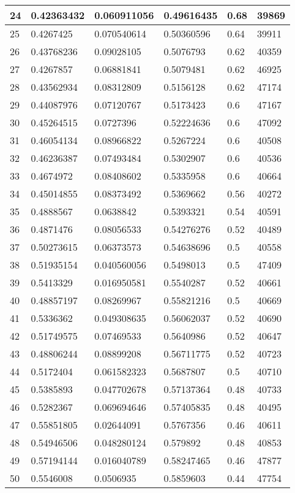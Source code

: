 \begin{longtable}{|l|l|l|l|l|l|}
24 & 0.42363432 & 0.060911056 & 0.49616435 & 0.68 & 39869 \\ \hline 
25 & 0.4267425 & 0.070540614 & 0.50360596 & 0.64 & 39911 \\ \hline 
26 & 0.43768236 & 0.09028105 & 0.5076793 & 0.62 & 40359 \\ \hline 
27 & 0.4267857 & 0.06881841 & 0.5079481 & 0.62 & 46925 \\ \hline 
28 & 0.43562934 & 0.08312809 & 0.5156128 & 0.62 & 47174 \\ \hline 
29 & 0.44087976 & 0.07120767 & 0.5173423 & 0.6 & 47167 \\ \hline 
30 & 0.45264515 & 0.0727396 & 0.52224636 & 0.6 & 47092 \\ \hline 
31 & 0.46054134 & 0.08966822 & 0.5267224 & 0.6 & 40508 \\ \hline 
32 & 0.46236387 & 0.07493484 & 0.5302907 & 0.6 & 40536 \\ \hline 
33 & 0.4674972 & 0.08408602 & 0.5335958 & 0.6 & 40664 \\ \hline 
34 & 0.45014855 & 0.08373492 & 0.5369662 & 0.56 & 40272 \\ \hline 
35 & 0.4888567 & 0.0638842 & 0.5393321 & 0.54 & 40591 \\ \hline 
36 & 0.4871476 & 0.08056533 & 0.54276276 & 0.52 & 40489 \\ \hline 
37 & 0.50273615 & 0.06373573 & 0.54638696 & 0.5 & 40558 \\ \hline 
38 & 0.51935154 & 0.040560056 & 0.5498013 & 0.5 & 47409 \\ \hline 
39 & 0.5413329 & 0.016950581 & 0.5540287 & 0.52 & 40661 \\ \hline 
40 & 0.48857197 & 0.08269967 & 0.55821216 & 0.5 & 40669 \\ \hline 
41 & 0.5336362 & 0.049308635 & 0.56062037 & 0.52 & 40690 \\ \hline 
42 & 0.51749575 & 0.07469533 & 0.5640986 & 0.52 & 40647 \\ \hline 
43 & 0.48806244 & 0.08899208 & 0.56711775 & 0.52 & 40723 \\ \hline 
44 & 0.5172404 & 0.061582323 & 0.5687807 & 0.5 & 40710 \\ \hline 
45 & 0.5385893 & 0.047702678 & 0.57137364 & 0.48 & 40733 \\ \hline 
46 & 0.5282367 & 0.069694646 & 0.57405835 & 0.48 & 40495 \\ \hline 
47 & 0.55851805 & 0.02644091 & 0.5767356 & 0.46 & 40611 \\ \hline 
48 & 0.54946506 & 0.048280124 & 0.579892 & 0.48 & 40853 \\ \hline 
49 & 0.57194144 & 0.016040789 & 0.58247465 & 0.46 & 47877 \\ \hline 
50 & 0.5546008 & 0.0506935 & 0.5859603 & 0.44 & 47754 \\ \hline 
\end{longtable}